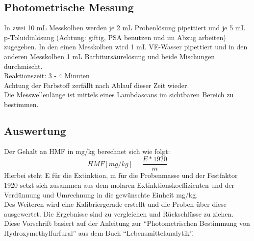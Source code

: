 \subsection{Photometrische Messung}
In zwei 10 mL Messkolben werden je 2 mL Probenlösung pipettiert und je 5 mL p-Toluidinlösung (Achtung: giftig, PSA benutzen und im Abzug arbeiten) zugegeben. In den einen Messkolben wird 1 mL VE-Wasser pipettiert und in den anderen Messkolben 1 mL Barbitursäurelösung und beide Mischungen durchmischt.\\ 
Reaktionszeit: 3 - 4 Minuten\\
Achtung der Farbstoff zerfällt nach Ablauf dieser Zeit wieder.\\
Die Messwellenlänge ist mittels eines Lambdascans im sichtbaren Bereich zu bestimmen.
\subsection{Auswertung}
Der Gehalt an HMF in mg/kg berechnet sich wie folgt:\\
\[HMF[mg/kg]=\frac{ E * 1920 }{ m }\]
Hierbei steht E für die Extinktion, m für die Probenmasse und der Festfaktor 1920 setzt sich zusammen aus dem molaren Extinktionskoeffizienten und der Verdünnung und Umrechnung in die gewünschte Einheit mg/kg.\\
Des Weiteren wird eine Kalibriergerade erstellt und die Proben über diese ausgewertet.
Die Ergebnisse sind zu vergleichen und Rückschlüsse zu ziehen.\\
Diese Vorschrift basiert auf der Anleitung zur ``Photometrischen Bestimmung von Hydroxymethylfurfural'' aus dem Buch ``Lebensmittelanalytik''. %